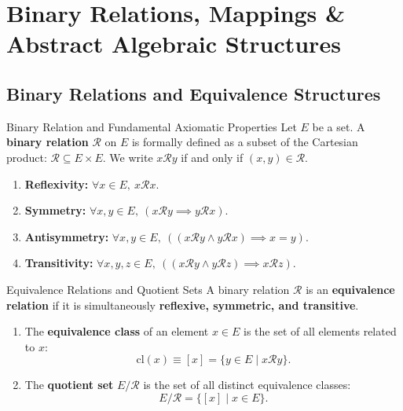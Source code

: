 \chapter{Binary Relations, Mappings \& Abstract Algebraic Structures}
\label{chap:relations_structures}

\section{Binary Relations and Equivalence Structures}

\begin{definitionbox}{Binary Relation and Fundamental Axiomatic Properties}
Let $E$ be a set. A \textbf{binary relation} $\mathcal{R}$ on $E$ is formally defined as a subset of the Cartesian product: $\mathcal{R} \subseteq E \times E$. We write $x \mathcal{R} y$ if and only if $(x, y) \in \mathcal{R}$.
\begin{enumerate}[leftmargin=1.4em,itemsep=3pt]
  \item \textbf{Reflexivity:} $\forall x \in E, \ x \mathcal{R} x$.
  \item \textbf{Symmetry:} $\forall x, y \in E, \ (x \mathcal{R} y \implies y \mathcal{R} x)$.
  \item \textbf{Antisymmetry:} $\forall x, y \in E, \ ((x \mathcal{R} y \land y \mathcal{R} x) \implies x = y)$.
  \item \textbf{Transitivity:} $\forall x, y, z \in E, \ ((x \mathcal{R} y \land y \mathcal{R} z) \implies x \mathcal{R} z)$.
\end{enumerate}
\end{definitionbox}

\begin{definitionbox}{Equivalence Relations and Quotient Sets}
A binary relation $\mathcal{R}$ is an \textbf{equivalence relation} if it is simultaneously \textbf{reflexive, symmetric, and transitive}.
\begin{enumerate}[leftmargin=1.4em,itemsep=2pt]
  \item The \textbf{equivalence class} of an element $x \in E$ is the set of all elements related to $x$:
  \[
  \mathrm{cl}(x) \equiv [x] = \{ y \in E \mid x \mathcal{R} y \}.
  \]
  \item The \textbf{quotient set} $E / \mathcal{R}$ is the set of all distinct equivalence classes:
  \[
  E / \mathcal{R} = \{ [x] \mid x \in E \}.
  \]
\end{enumerate}
\end{definitionbox}

